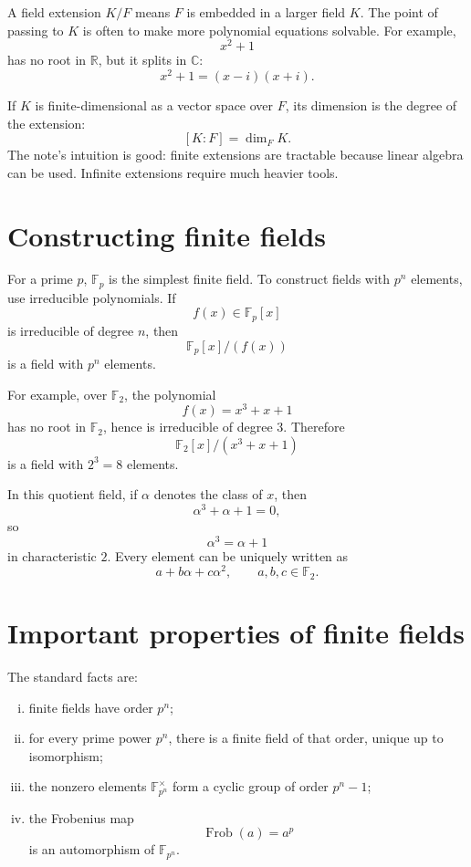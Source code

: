 A field extension \(K/F\) means \(F\) is embedded in a larger field \(K\).  The point of passing to \(K\) is often to make more polynomial equations solvable.  For example,
\[
  x^2+1
\]
has no root in \(\mathbb R\), but it splits in \(\mathbb C\):
\[
  x^2+1=(x-i)(x+i).
\]

If \(K\) is finite-dimensional as a vector space over \(F\), its dimension is the degree of the extension:
\[
  [K:F]=\dim_F K.
\]
The note's intuition is good: finite extensions are tractable because linear algebra can be used.  Infinite extensions require much heavier tools.

\section{Constructing finite fields}

For a prime \(p\), \(\mathbb F_p\) is the simplest finite field.  To construct fields with \(p^n\) elements, use irreducible polynomials.  If
\[
  f(x)\in\mathbb F_p[x]
\]
is irreducible of degree \(n\), then
\[
  \mathbb F_p[x]/(f(x))
\]
is a field with \(p^n\) elements.

For example, over \(\mathbb F_2\), the polynomial
\[
  f(x)=x^3+x+1
\]
has no root in \(\mathbb F_2\), hence is irreducible of degree \(3\).  Therefore
\[
  \mathbb F_2[x]/(x^3+x+1)
\]
is a field with \(2^3=8\) elements.

In this quotient field, if \(\alpha\) denotes the class of \(x\), then
\[
  \alpha^3+\alpha+1=0,
\]
so
\[
  \alpha^3=\alpha+1
\]
in characteristic \(2\).  Every element can be uniquely written as
\[
  a+b\alpha+c\alpha^2,\qquad a,b,c\in\mathbb F_2.
\]

\section{Important properties of finite fields}

The standard facts are:
\begin{enumerate}[(i)]
  \item finite fields have order \(p^n\);
  \item for every prime power \(p^n\), there is a finite field of that order, unique up to isomorphism;
  \item the nonzero elements \(\mathbb F_{p^n}^\times\) form a cyclic group of order \(p^n-1\);
  \item the Frobenius map
  \[
    \operatorname{Frob}(a)=a^p
  \]
  is an automorphism of \(\mathbb F_{p^n}\).

\end{enumerate}

